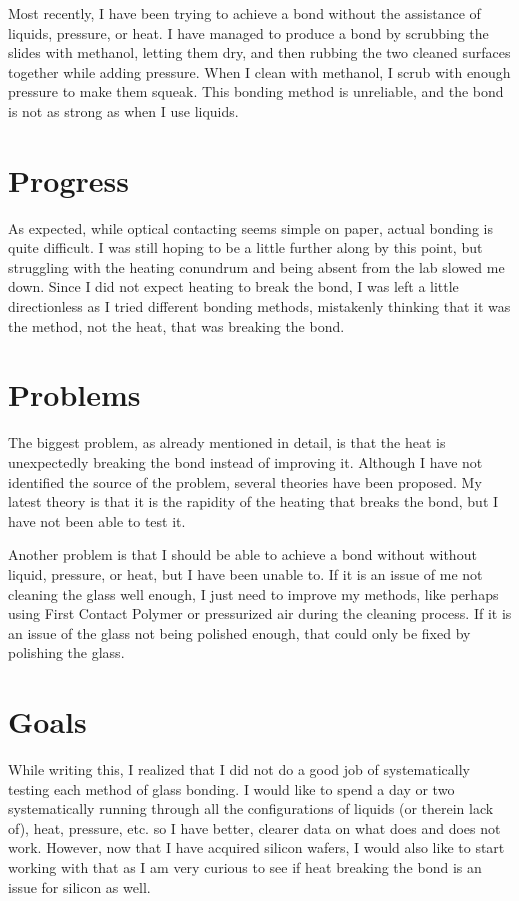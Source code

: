 \documentclass[colorlinks=true,pdfstartview=FitV,linkcolor=blue,
            citecolor=red,urlcolor=magenta]{ligodoc}
\begin{document}
Most recently, I have been trying to achieve a bond without the assistance of liquids, pressure, or heat. I have managed to produce a bond by scrubbing the slides with methanol, letting them dry, and then rubbing the two cleaned surfaces together while adding pressure. When I clean with methanol, I scrub with enough pressure to make them squeak. This bonding method is unreliable, and the bond is not as strong as when I use liquids.

\section{Progress}

As expected, while optical contacting seems simple on paper, actual bonding is quite difficult. I was still hoping to be a little further along by this point, but struggling with the heating conundrum and being absent from the lab slowed me down. Since I did not expect heating to break the bond, I was left a little directionless as I tried different bonding methods, mistakenly thinking that it was the method, not the heat, that was breaking the bond.

\section{Problems}

The biggest problem, as already mentioned in detail, is that the heat is unexpectedly breaking the bond instead of improving it. Although I have not identified the source of the problem, several theories have been proposed. My latest theory is that it is the rapidity of the heating that breaks the bond, but I have not been able to test it.

Another problem is that I should be able to achieve a bond without without liquid, pressure, or heat, but I have been unable to. If it is an issue of me not cleaning the glass well enough, I just need to improve my methods, like perhaps using First Contact Polymer or pressurized air during the cleaning process. If it is an issue of the glass not being polished enough, that could only be fixed by polishing the glass.

\section{Goals}

While writing this, I realized that I did not do a good job of systematically testing each method of glass bonding. I would like to spend a day or two systematically running through all the configurations of liquids (or therein lack of), heat, pressure, etc. so I have better, clearer data on what does and does not work. However, now that I have acquired silicon wafers, I would also like to start working with that as I am very curious to see if heat breaking the bond is an issue for silicon as well.
\end{document}
